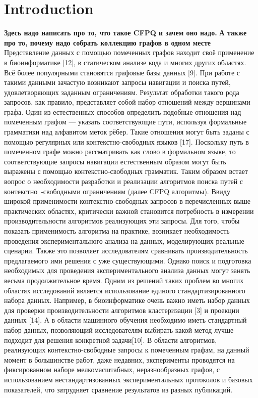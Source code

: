 \section{Introduction}
\textbf{Здесь надо написать про то, что такое CFPQ и зачем оно надо.}
\textbf{А также про то, почему надо собрать коллекцию графов в одном месте}
Представление данных с помощью помеченных графов находит своё применение в биоинформатике [12], в статическом анализе кода и многих других областях. 
Всё более популярными становятся графовые базы данных [9]. 
При работе с такими данными зачастую возникают запросы навигации и поиска путей, удовлетворяющих заданным ограничениям. 
Результат обработки такого рода запросов, как правило, представляет собой набор отношений между вершинами графа. 
Один из естественных способов определить подобные отношения над помеченным графом — указать соответствующие пути, используя формальные грамматики над алфавитом меток рёбер. 
Такие отношения могут быть заданы с помощью регулярных или контекстно-свободных языков [17].
Поскольку путь в помеченном графе можно рассматривать как слово в формальном языке, то соответствующие запросы навигации естественным образом могут быть выражены с помощью контекстно-свободных грамматик. 
Таким образом встает вопрос о необходимости разработки и реализации алгоритмов поиска путей с контекстно~-свободными ограничениям (далее CFPQ алгоритмы).
Ввиду широкой применимости контекстно-свободных запросов в перечисленных выше практических областях, критически важной становится потребность в измерении производительности алгоритмов реализующих эти запросы. 
Для того, чтобы показать применимость алгоритма на практике, возникает необходимость проведения экспериментального анализа на данных, моделирующих реальные сценарии. 
Также это позволяет исследователям сравнивать производительность предлагаемого ими решения с уже существующими.
Однако поиск и подготовка необходимых для проведения экспериментального анализа данных могут занять весьма продолжительное время. 
Одним из решений таких проблем во многих областях исследований является использование единого стандартизированного набора данных. 
Например, в биоинформатике очень важно иметь набор данных для проверки производительности алгоритмов кластеризации [3] и проекции данных [14]. 
А в области машинного обучения необходимо иметь стандартный набор данных, позволяющий исследователям выбирать какой метод лучше подходит для решения конкретной задачи[10]. 
В области алгоритмов, реализующих контекстно-свободные запросы к помеченным графам, на данный момент в большинстве работ, даже недавних, эксперименты проводятся на фиксированном наборе мелкомасштабных, неразнообразных графов, с использованием нестандартизованных экспериментальных протоколов и базовых показателей, что затрудняет сравнение результатов из разных публикаций.

